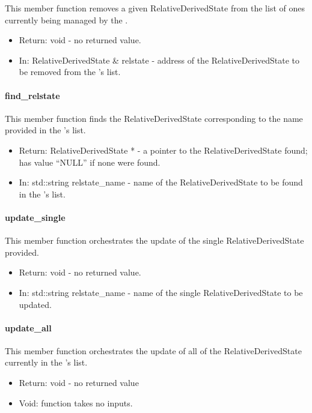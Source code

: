 This member function removes a given RelativeDerivedState from the list of
ones currently being managed by the \relkinDesc.

\begin{itemize}
\item{Return:} void - no returned value.
\item{In:} RelativeDerivedState \& relstate - address of the
RelativeDerivedState to be removed from the \relkinDesc's list.
\end{itemize}

\paragraph{find\_relstate}

This member function finds the RelativeDerivedState corresponding to the name
provided in the \relkinDesc's list.

\begin{itemize}
\item{Return:} RelativeDerivedState * - a pointer to the RelativeDerivedState
found; has value ``NULL'' if none were found.
\item{In:} std::string relstate\_name - name of the
RelativeDerivedState to be found in the \relkinDesc's list.
\end{itemize}

\paragraph{update\_single}

This member function orchestrates the update of the single
RelativeDerivedState provided.

\begin{itemize}
\item{Return:} void - no returned value.
\item{In:} std::string relstate\_name - name of the single
RelativeDerivedState to be updated.
\end{itemize}

\paragraph{update\_all}

This member function orchestrates the update of all of the
RelativeDerivedState currently in the \relkinDesc's list.

\begin{itemize}
\item{Return:} void - no returned value
\item{Void:} function takes no inputs.
\end{itemize}

